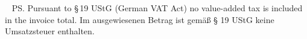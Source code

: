 \documentclass[a4paper]{scrlttr2}
\begin{document}
\begin{letter}{%
		\ifdefempty{\customerCompany}{}{\customerCompany \\}%
		\ifdefempty{\customerName}{}{\customerName \\}%
		\ifdefempty{\customerStreet}{}{\customerStreet \\}%
		\customerZIP \ \customerCity}
		\ifHasAnyVat\else
		\ps\ifEnglish
		  Pursuant to \S\,19 UStG (German VAT Act) no value-added tax is included in the invoice total.%
		\else
		  Im ausgewiesenen Betrag ist gemäß § 19 UStG keine Umsatzsteuer enthalten.%
		\fi
		\fi

		\renewcommand*{\raggedsignature}{\raggedright}
		\closing{\invoiceClosing}
		\invoiceEnclosures



	\end{letter}
\end{document}
